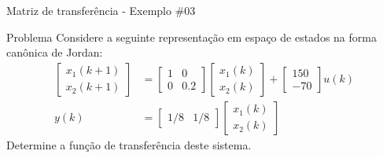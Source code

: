 \begin{frame}{Matriz de transferência - Exemplo \#03}
\begin{block}{Problema}
Considere a seguinte representação em espaço de estados na forma canônica de Jordan:
\begin{align*}
    \begin{bmatrix} x_1(k+1) \\ x_2(k+1) \end{bmatrix}
    &=
    \begin{bmatrix}
    1 & 0 \\ 0 & \num{0,2}
    \end{bmatrix}
    \begin{bmatrix}
    x_1(k) \\ x_2(k)
    \end{bmatrix}
    +
    \begin{bmatrix}
    150 \\ -70
    \end{bmatrix}
    u(k) \\
    y(k)
    &=
    \begin{bmatrix}
    1/8 & 1/8
    \end{bmatrix}
    \begin{bmatrix}
    x_1(k) \\ x_2(k)
    \end{bmatrix}
\end{align*}
Determine a função de transferência deste sistema.
\end{block}
\end{frame}

